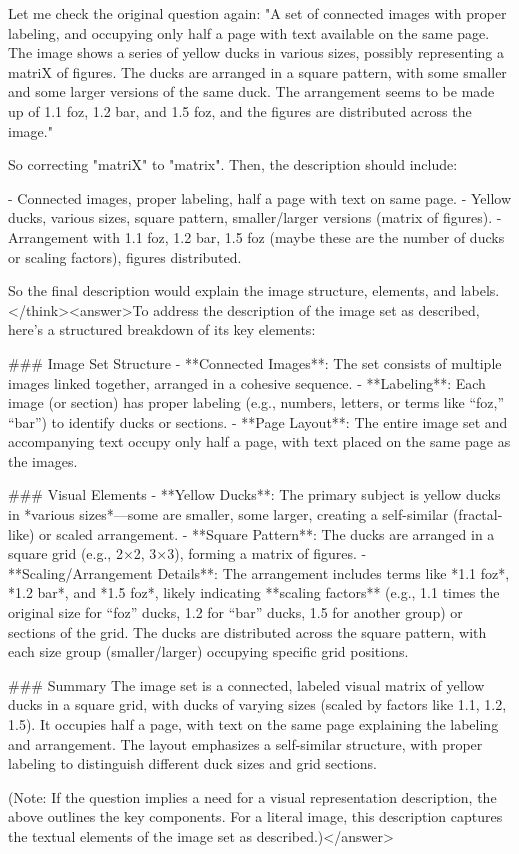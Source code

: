 Let me check the original question again: "A set of connected images with proper labeling, and occupying only half a page with text available on the same page. The image shows a series of yellow ducks in various sizes, possibly representing a matriX of figures. The ducks are arranged in a square pattern, with some smaller and some larger versions of the same duck. The arrangement seems to be made up of 1.1 foz, 1.2 bar, and 1.5 foz, and the figures are distributed across the image."

So correcting "matriX" to "matrix". Then, the description should include:

- Connected images, proper labeling, half a page with text on same page.
- Yellow ducks, various sizes, square pattern, smaller/larger versions (matrix of figures).
- Arrangement with 1.1 foz, 1.2 bar, 1.5 foz (maybe these are the number of ducks or scaling factors), figures distributed.

So the final description would explain the image structure, elements, and labels.</think><answer>To address the description of the image set as described, here’s a structured breakdown of its key elements:  

### Image Set Structure  
- **Connected Images**: The set consists of multiple images linked together, arranged in a cohesive sequence.  
- **Labeling**: Each image (or section) has proper labeling (e.g., numbers, letters, or terms like “foz,” “bar”) to identify ducks or sections.  
- **Page Layout**: The entire image set and accompanying text occupy only half a page, with text placed on the same page as the images.    

### Visual Elements  
- **Yellow Ducks**: The primary subject is yellow ducks in *various sizes*—some are smaller, some larger, creating a self-similar (fractal-like) or scaled arrangement.  
- **Square Pattern**: The ducks are arranged in a square grid (e.g., 2×2, 3×3), forming a matrix of figures.  
- **Scaling/Arrangement Details**: The arrangement includes terms like *1.1 foz*, *1.2 bar*, and *1.5 foz*, likely indicating **scaling factors** (e.g., 1.1 times the original size for “foz” ducks, 1.2 for “bar” ducks, 1.5 for another group) or sections of the grid. The ducks are distributed across the square pattern, with each size group (smaller/larger) occupying specific grid positions.    

### Summary  
The image set is a connected, labeled visual matrix of yellow ducks in a square grid, with ducks of varying sizes (scaled by factors like 1.1, 1.2, 1.5). It occupies half a page, with text on the same page explaining the labeling and arrangement. The layout emphasizes a self-similar structure, with proper labeling to distinguish different duck sizes and grid sections.  


(Note: If the question implies a need for a visual representation description, the above outlines the key components. For a literal image, this description captures the textual elements of the image set as described.)</answer>